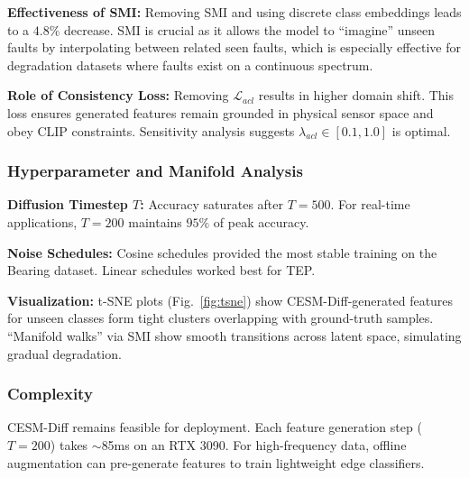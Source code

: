 \textbf{Effectiveness of SMI:} Removing SMI and using discrete class embeddings leads to a $4.8\%$ decrease. SMI is crucial as it allows the model to ``imagine'' unseen faults by interpolating between related seen faults, which is especially effective for degradation datasets where faults exist on a continuous spectrum.

\textbf{Role of Consistency Loss:} Removing $\mathcal{L}_{acl}$ results in higher domain shift. This loss ensures generated features remain grounded in physical sensor space and obey CLIP constraints. Sensitivity analysis suggests $\lambda_{acl} \in [0.1, 1.0]$ is optimal.

\subsubsection{Hyperparameter and Manifold Analysis}
\textbf{Diffusion Timestep $T$:} Accuracy saturates after $T=500$. For real-time applications, $T=200$ maintains $95\%$ of peak accuracy.

\textbf{Noise Schedules:} Cosine schedules provided the most stable training on the Bearing dataset. Linear schedules worked best for TEP.

\textbf{Visualization:} t-SNE plots (Fig.~\ref{fig:tsne}) show CESM-Diff-generated features for unseen classes form tight clusters overlapping with ground-truth samples. ``Manifold walks'' via SMI show smooth transitions across latent space, simulating gradual degradation.

\subsubsection{Complexity}
CESM-Diff remains feasible for deployment. Each feature generation step ($T=200$) takes $\sim$85ms on an RTX 3090. For high-frequency data, offline augmentation can pre-generate features to train lightweight edge classifiers.
